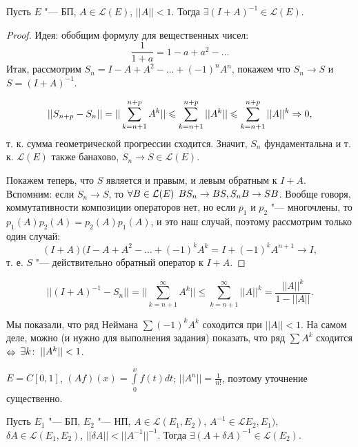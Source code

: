 \documentclass[main]{subfiles}
\begin{document}
\begin{theorem}
  Пусть \( E \) "--- БП, \( A \in \mathcal{L}(E) \),
  \( ||A|| < 1 \). Тогда \( \exists (I + A)^{-1} \in \mathcal{L}(E) \).
\end{theorem}
\begin{proof}
  Идея: обобщим формулу для вещественных чисел:
  \[ \frac{1}{1 + a} = 1 - a + a^2 - \dots \]
  Итак, рассмотрим \( S_n = I - A + A^2 - \dots + (-1)^n A^n \),
  покажем что \( S_n \to S \) и \( S = (I + A)^{-1} \).

  \[ ||S_{n + p} - S_n|| = ||\sum_{k = n + 1}^{n + p} A^k|| \leqslant
    \sum_{k = n + 1}^{n + p} ||A^k|| \leqslant \sum_{k = n + 1}^{n + p} ||A||^k
  \Rightarrow 0, \]
  т. к. сумма геометрической прогрессии сходится.
  Значит, \( { S_n} \) фундаментальна и т. к. \( \mathcal{L}(E) \)
  также банахово, \( S_n \to S \in \mathcal{L}(E) \).

  Покажем теперь, что \( S \) является и правым, и левым обратным к \( I + A \).
  Вспомним: если \( S_n \to S \), то \( \forall {B \in \mathcal{L}(E)} \; \, BS_n \to BS,
  S_n B \to SB \). Вообще говоря, коммутативности композиции операторов нет,
  но если \( p_1 \) и \( p_2 \) "--- многочлены, то
  \( p_1(A) p_2(A) = p_2(A) p_1(A) \), и это наш случай, поэтому рассмотрим только
  один случай:
  \[ (I + A)(I - A + A^2 - \dots + (-1)^k A^k =
  I + (-1)^k A^{n + 1} \to I, \]
  т. е. \( S \) "--- действительно обратный оператор к \( I + A \).
\end{proof}
\begin{corollary}
  \[ ||(I + A)^{-1} - S_n|| = ||\sum_{k = n + 1}^\infty A^k|| \le
  \sum_{k = n+1}^\infty ||A||^k = \frac{||A||^k}{1 - ||A||}. \]
\end{corollary}

\begin{remark}
  Мы показали, что ряд Неймана \( \sum (-1)^k A^k \) соходится при
  \( ||A|| < 1 \). На самом деле, можно (и нужно для выполнения задания)
  показать, что ряд \( \sum A^k \) сходится \( \Leftrightarrow \)
  \( \exists k \colon \: ||A^k|| < 1 \).
\end{remark}

\begin{example}
  \( E = C[0, 1] \), \( (Af)(x) = \int\limits_0^x f(t) dt \);
  \( ||A^n|| = \frac{1}{n!} \), поэтому уточнение существенно.
\end{example}

\begin{theorem}
  Пусть \( E_1 \) "--- БП, \( E_2 \) "--- НП,
  \( A \in \mathcal{L}(E_1, E_2) \),
  \( A^{-1} \in \mathcal{L}E_2, E_1) \),
  \( \delta A \in \mathcal{L}(E_1, E_2) \),
  \( ||\delta A|| < ||A^{-1}||^{-1} \).
  Тогда \( \exists (A + \delta A)^{-1} \in \mathcal{L}(E_2) \).
\end{theorem}
\end{document}
